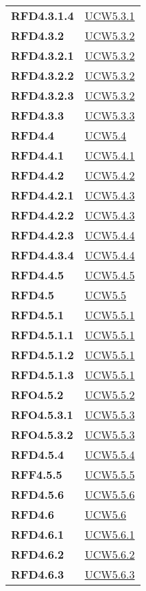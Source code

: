 \begin{longtable}[H]{|>{\centering\bfseries}m{8cm} | >{\centering\arraybackslash}m{8cm} |}
    RFD4.3.1.4 & \hyperref[par:ucw5.3.1]{UCW5.3.1} \\
    RFD4.3.2 & \hyperref[par:ucw5.3.2]{UCW5.3.2} \\
    RFD4.3.2.1 & \hyperref[par:ucw5.3.2]{UCW5.3.2} \\
    RFD4.3.2.2 & \hyperref[par:ucw5.3.2]{UCW5.3.2} \\
    RFD4.3.2.3 & \hyperref[par:ucw5.3.2]{UCW5.3.2} \\
    RFD4.3.3 & \hyperref[par:ucw5.3.3]{UCW5.3.3} \\
    RFD4.4 & \hyperref[ssub:ucw5.4]{UCW5.4} \\
    RFD4.4.1 & \hyperref[par:ucw5.4.1]{UCW5.4.1} \\
    RFD4.4.2 & \hyperref[par:ucw5.4.1]{UCW5.4.2} \\
    RFD4.4.2.1 & \hyperref[par:ucw5.4.3]{UCW5.4.3} \\
    RFD4.4.2.2 & \hyperref[par:ucw5.4.3]{UCW5.4.3} \\
    RFD4.4.2.3 & \hyperref[par:ucw5.4.4]{UCW5.4.4} \\
    RFD4.4.3.4 & \hyperref[par:ucw5.4.4]{UCW5.4.4} \\
    RFD4.4.5 & \hyperref[par:ucw5.4.5]{UCW5.4.5} \\
    RFD4.5 & \hyperref[ssub:ucw5.5]{UCW5.5} \\
    RFD4.5.1 & \hyperref[par:ucw5.5.1]{UCW5.5.1} \\
    RFD4.5.1.1 & \hyperref[par:ucw5.5.1]{UCW5.5.1} \\
    RFD4.5.1.2 & \hyperref[par:ucw5.5.1]{UCW5.5.1} \\
    RFD4.5.1.3 & \hyperref[par:ucw5.5.1]{UCW5.5.1} \\
    RFO4.5.2 & \hyperref[par:ucw5.5.2]{UCW5.5.2} \\
    RFO4.5.3.1 & \hyperref[par:ucw5.5.3]{UCW5.5.3} \\
    RFO4.5.3.2 & \hyperref[par:ucw5.5.3]{UCW5.5.3} \\
    RFD4.5.4 & \hyperref[par:ucw5.5.4]{UCW5.5.4} \\
    RFF4.5.5 & \hyperref[par:ucw5.5.5]{UCW5.5.5} \\
    RFD4.5.6 & \hyperref[par:ucw5.5.6]{UCW5.5.6} \\
    RFD4.6 & \hyperref[ssub:ucw5.6]{UCW5.6} \\
    RFD4.6.1 & \hyperref[par:ucw5.6.1]{UCW5.6.1} \\
    RFD4.6.2 & \hyperref[par:ucw5.6.2]{UCW5.6.2} \\
    RFD4.6.3 & \hyperref[par:ucw5.6.3]{UCW5.6.3} \\

\end{longtable}
